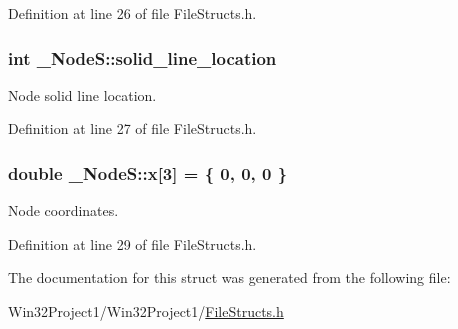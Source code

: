 Definition at line 26 of file File\+Structs.\+h.

\subsubsection[{\texorpdfstring{solid\+\_\+line\+\_\+location}{solid_line_location}}]{\setlength{\rightskip}{0pt plus 5cm}int \+\_\+\+Node\+S\+::solid\+\_\+line\+\_\+location}\hypertarget{struct___node_s_a486190cb5907d2695e87793dce313bbf}{}\label{struct___node_s_a486190cb5907d2695e87793dce313bbf}


Node solid line location. 



Definition at line 27 of file File\+Structs.\+h.

\subsubsection[{\texorpdfstring{x}{x}}]{\setlength{\rightskip}{0pt plus 5cm}double \+\_\+\+Node\+S\+::x\mbox{[}3\mbox{]} = \{ 0, 0, 0 \}}\hypertarget{struct___node_s_ab60b09e8b5b8009b574b9a0a49dd63fa}{}\label{struct___node_s_ab60b09e8b5b8009b574b9a0a49dd63fa}


Node coordinates. 



Definition at line 29 of file File\+Structs.\+h.



The documentation for this struct was generated from the following file\+:\begin{DoxyCompactItemize}
\item 
Win32\+Project1/\+Win32\+Project1/\hyperlink{_file_structs_8h}{File\+Structs.\+h}\end{DoxyCompactItemize}
